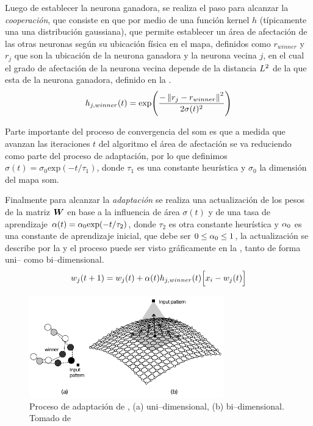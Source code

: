 Luego de establecer la neurona ganadora, se realiza el paso para alcanzar la \emph{cooperación}, que consiste en que por medio de una función kernel $h$ (típicamente una una distribución gaussiana), que permite establecer un área de afectación de las otras neuronas según su ubicación física en el mapa, definidos como $r_{winner}$ y $r_j$ que son la ubicación de la neurona ganadora y la neurona vecina $j$, en el cual el grado de afectación de la neurona vecina depende de la distancia $L^2$ de la que esta de la neurona ganadora, definido en la .
\begin{equation} \label{eq:som-cooperation}
  h_{j, winner}(t) = \text{exp}\Bigg(\frac{- \left\lVert r_j - r_{winner}\right\rVert^2}{ 2 \sigma(t)^2}\Bigg)
\end{equation}

Parte importante del proceso de convergencia del \gls{som} es que a medida que avanzan las iteraciones $t$ del algoritmo el área de afectación se va reduciendo como parte del proceso de adaptación, por lo que definimos $\sigma(t) = \sigma_0 \text{exp}(-t / \tau_1)$, donde $\tau_1$ es una constante heurística y $\sigma_0$ la dimensión del mapa \gls{som}.

Finalmente para alcanzar la \emph{adaptación} se realiza una actualización de los pesos de la matriz ${\bm{W}}$ en base a la influencia de área $\sigma(t)$ y de una tasa de aprendizaje $\alpha(t) = \alpha_0 \text{exp}(-t/ \tau_2)$, donde $\tau_2$ es otra constante heurística y $\alpha_0$ es una constante de aprendizaje inicial, que debe ser $0 \le \alpha_0 \le 1$, la actualización se describe por la  y el proceso puede ser visto gráficamente en la , tanto de forma uni-- como bi--dimensional.
\begin{equation} \label{eq:som-adaptation}
  w_j(t+1) = w_j(t) + \alpha(t) h_{j, winner}(t)\Big[x_i-w_j(t)\Big]
\end{equation}

\begin{figure}[H]
\centering
\includegraphics[width=0.75\textwidth]{Figures/som-adaptive-proc.pdf}
\decoRule
\caption[Proceso de adaptación de ]{Proceso de adaptación de , (a) uni--dimensional, (b) bi--dimensional. Tomado de \cite{de2006fundamentals}}
\label{fig:som-adap-proc}
\end{figure}

